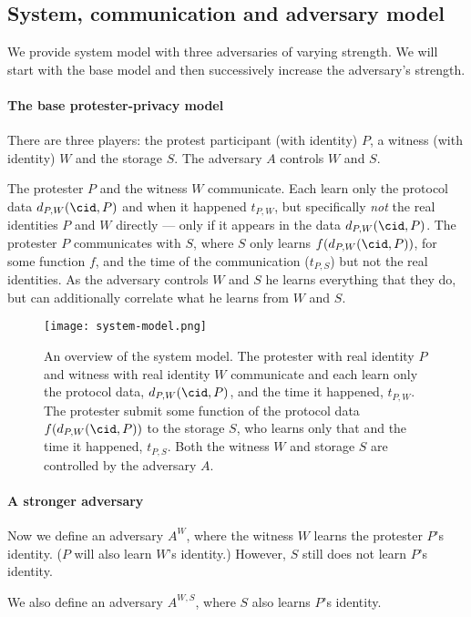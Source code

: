 \subsection{System, communication and adversary model}%
\label{adversary-model}

We provide system model with three adversaries of varying strength.
We will start with the base model and then successively increase the 
adversary's strength.

\paragraph{The base protester-privacy model}

There are three players: the protest participant (with identity) \(P\), a 
witness (with identity) \(W\) and the storage \(S\).
The adversary \(A\) controls \(W\) and \(S\).

The protester \(P\) and the witness \(W\) communicate.
Each learn only the protocol data \(d_{P,W}(\cid, P)\) and when it happened 
\(t_{P,W}\), but specifically \emph{not} the real identities \(P\) and \(W\) 
directly --- only if it appears in the data \(d_{P,W}(\cid, P)\).
The protester \(P\) communicates with \(S\), where \(S\) only learns 
\(f(d_{P,W}(\cid, P))\), for some function \(f\), and the time of the 
communication (\(t_{P,S}\)) but not the real identities.
As the adversary controls \(W\) and \(S\) he learns everything that they do, 
but can additionally correlate what he learns from \(W\) and \(S\).

\begin{figure}
  \centering
  \texttt{[image: system-model.png]}
  \caption{\label{fig:system-model}%
    An overview of the system model.
    The protester with real identity \(P\) and witness with real identity \(W\) 
    communicate and each learn only the protocol data, \(d_{P,W}(\cid, P)\), 
    and the time it happened, \(t_{P,W}\).
    The protester submit some function of the protocol data \(f(d_{P,W}(\cid, 
      P))\) to the storage \(S\), who learns only that and the time it 
    happened, \(t_{P,S}\).
    Both the witness \(W\) and storage \(S\) are controlled by the adversary 
    \(A\).
  }
\end{figure}

\paragraph{A stronger adversary}

Now we define an adversary \(A^W\), where the witness \(W\) learns the 
protester \(P\)'s identity.
(\(P\) will also learn \(W\)'s identity.)
However, \(S\) still does not learn \(P\)'s identity.

We also define an adversary \(A^{W,S}\), where \(S\) also learns \(P\)'s 
identity.
